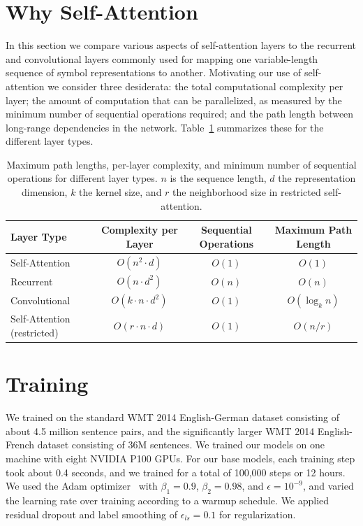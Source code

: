 \documentclass[conference]{IEEEtran}
\begin{document}
\section{Why Self-Attention}
In this section we compare various aspects of self-attention layers to the
recurrent and convolutional layers commonly used for mapping one variable-length
sequence of symbol representations to another. Motivating our use of
self-attention we consider three desiderata: the total computational complexity
per layer; the amount of computation that can be parallelized, as measured by the
minimum number of sequential operations required; and the path length between
long-range dependencies in the network. Table~\ref{tab:complexity} summarizes
these for the different layer types.

\begin{table}[t]
\centering
\caption{Maximum path lengths, per-layer complexity, and minimum number of
sequential operations for different layer types. $n$ is the sequence length, $d$
the representation dimension, $k$ the kernel size, and $r$ the neighborhood size
in restricted self-attention.}
\label{tab:complexity}
\begin{tabular}{@{}lccc@{}}
\toprule
Layer Type & Complexity per Layer & Sequential Operations & Maximum Path Length \\
\midrule
Self-Attention             & $O(n^2 \cdot d)$        & $O(1)$ & $O(1)$ \\
Recurrent                  & $O(n \cdot d^2)$        & $O(n)$ & $O(n)$ \\
Convolutional              & $O(k \cdot n \cdot d^2)$ & $O(1)$ & $O(\log_k n)$ \\
Self-Attention (restricted) & $O(r \cdot n \cdot d)$  & $O(1)$ & $O(n/r)$ \\
\bottomrule
\end{tabular}
\end{table}

\section{Training}
We trained on the standard WMT 2014 English-German dataset consisting of about 4.5
million sentence pairs, and the significantly larger WMT 2014 English-French
dataset consisting of 36M sentences. We trained our models on one machine with
eight NVIDIA P100 GPUs. For our base models, each training step took about 0.4
seconds, and we trained for a total of 100{,}000 steps or 12 hours. We used the
Adam optimizer~\cite{kingma2015} with $\beta_1 = 0.9$, $\beta_2 = 0.98$, and
$\epsilon = 10^{-9}$, and varied the learning rate over training according to a
warmup schedule. We applied residual dropout and label smoothing of
$\epsilon_{ls} = 0.1$ for regularization.
\end{document}
